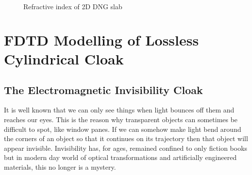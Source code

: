\documentclass{article}
\begin{document}
\begin{figure}[t!]
\caption{Refractive index of 2D DNG slab}
\label{fig:2DDNG-Refractive-Index}
\end{figure}
\section{FDTD Modelling of Lossless Cylindrical Cloak}
\subsection{The Electromagnetic Invisibility Cloak}
It is well known that we can only see things when light bounces off them and reaches our eyes. This is the reason why transparent objects can sometimes be difficult to spot, like window panes. If we can somehow make light bend around the corners of an object so that it continues on its trajectory then that object will appear invisible. Invisibility has, for ages, remained confined to only fiction books but in modern day world of optical transformations and artificially engineered materials, this no longer is a mystery.
\end{document}
